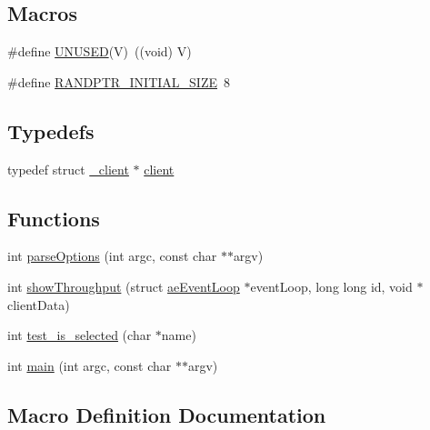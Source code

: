 \subsection*{Macros}
\begin{DoxyCompactItemize}
\item 
\#define \hyperlink{redis-benchmark_8c_ae7c9dc8f13568a9c856573751f1ee1ec}{U\+N\+U\+S\+ED}(V)~((void) V)
\item 
\#define \hyperlink{redis-benchmark_8c_aa36f1f87a96374eb350895416fc1affe}{R\+A\+N\+D\+P\+T\+R\+\_\+\+I\+N\+I\+T\+I\+A\+L\+\_\+\+S\+I\+ZE}~8
\end{DoxyCompactItemize}
\subsection*{Typedefs}
\begin{DoxyCompactItemize}
\item 
typedef struct \hyperlink{struct__client}{\+\_\+client} $\ast$ \hyperlink{redis-benchmark_8c_a6bf8c3f34a9af09c5f641d813a37d0a7}{client}
\end{DoxyCompactItemize}
\subsection*{Functions}
\begin{DoxyCompactItemize}
\item 
int \hyperlink{redis-benchmark_8c_a74bf03459da77735410345bcfa169d30}{parse\+Options} (int argc, const char $\ast$$\ast$argv)
\item 
int \hyperlink{redis-benchmark_8c_a79aaf5a27a13ca82710e13cd81a97362}{show\+Throughput} (struct \hyperlink{structae_event_loop}{ae\+Event\+Loop} $\ast$event\+Loop, long long id, void $\ast$client\+Data)
\item 
int \hyperlink{redis-benchmark_8c_a9e8afa52639855135cffe1d230c80a84}{test\+\_\+is\+\_\+selected} (char $\ast$name)
\item 
int \hyperlink{redis-benchmark_8c_a217dbf8b442f20279ea00b898af96f52}{main} (int argc, const char $\ast$$\ast$argv)
\end{DoxyCompactItemize}


\subsection{Macro Definition Documentation}
\mbox{\label{redis-benchmark_8c_aa36f1f87a96374eb350895416fc1affe}} 
